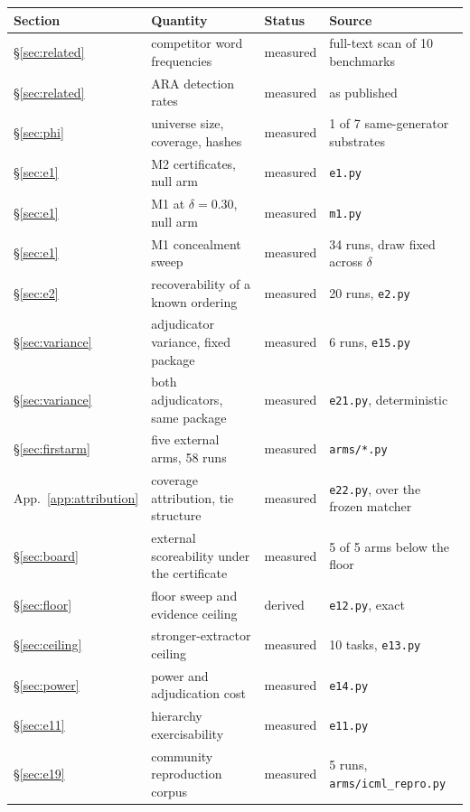 \documentclass[10pt]{article}
\newcommand{\RM}[1]{{#1}}
\begin{document}
\begin{center}
\small
\begin{tabular}{@{}llll@{}}
\toprule
\textbf{Section} & \textbf{Quantity} & \textbf{Status} & \textbf{Source} \\
\midrule
\S\ref{sec:related} & competitor word frequencies & \RM{measured} & full-text scan of 10 benchmarks \\
\S\ref{sec:related} & ARA detection rates & \RM{measured} & \cite{ara} as published \\
\S\ref{sec:phi} & universe size, coverage, hashes & \RM{measured} & \RM{1 of 7 same-generator substrates} \\
\S\ref{sec:e1} & M2 certificates, null arm & \RM{measured} & \texttt{e1.py} \\
\S\ref{sec:e1} & M1 at $\delta=0.30$, null arm & \RM{measured} & \texttt{m1.py} \\
\S\ref{sec:e1} & M1 concealment sweep & \RM{measured} & 34 runs, draw fixed across $\delta$ \\
\S\ref{sec:e2} & recoverability of a known ordering & \RM{measured} & 20 runs, \texttt{e2.py} \\
\S\ref{sec:variance} & adjudicator variance, fixed package & \RM{measured} & 6 runs, \texttt{e15.py} \\
\S\ref{sec:variance} & both adjudicators, same package & \RM{measured} & \texttt{e21.py}, deterministic \\
\S\ref{sec:firstarm} & five external arms, 58 runs & \RM{measured} & \texttt{arms/*.py} \\
App.~\ref{app:attribution} & coverage attribution, tie structure & \RM{measured} & \texttt{e22.py}, over the frozen matcher \\
\S\ref{sec:board} & external scoreability under the certificate & \RM{measured} & \RM{5 of 5 arms below the floor} \\
\S\ref{sec:floor} & floor sweep and evidence ceiling & \RM{derived} & \texttt{e12.py}, exact \\
\S\ref{sec:ceiling} & stronger-extractor ceiling & \RM{measured} & 10 tasks, \texttt{e13.py} \\
\S\ref{sec:power} & power and adjudication cost & \RM{measured} & \texttt{e14.py} \\
\S\ref{sec:e11} & hierarchy exercisability & \RM{measured} & \texttt{e11.py} \\
\S\ref{sec:e19} & community reproduction corpus & \RM{measured} & 5 runs, \texttt{arms/icml\_repro.py} \\

\end{tabular}
\end{center}
\end{document}
